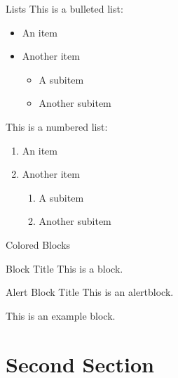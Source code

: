 \documentclass{beamer}
\begin{document}
    \begin{frame}{Lists}
        This is a bulleted list:
        \begin{itemize}
            \item An item

            \item Another item
            \begin{itemize}
                \item A subitem

                \item Another subitem
            \end{itemize}
        \end{itemize}

        This is a numbered list:
        \begin{enumerate}
            \item An item

            \item Another item
            \begin{enumerate}
                \item A subitem

                \item Another subitem
            \end{enumerate}
        \end{enumerate}
    \end{frame}

    \begin{frame}{Colored Blocks}
        \begin{block}{Block Title}
            This is a block.
        \end{block}

        \begin{alertblock}{Alert Block Title}
            This is an alertblock.
        \end{alertblock}

        \begin{example}
            This is an example block.
        \end{example}
    \end{frame}




\section{Second Section}
\end{document}
